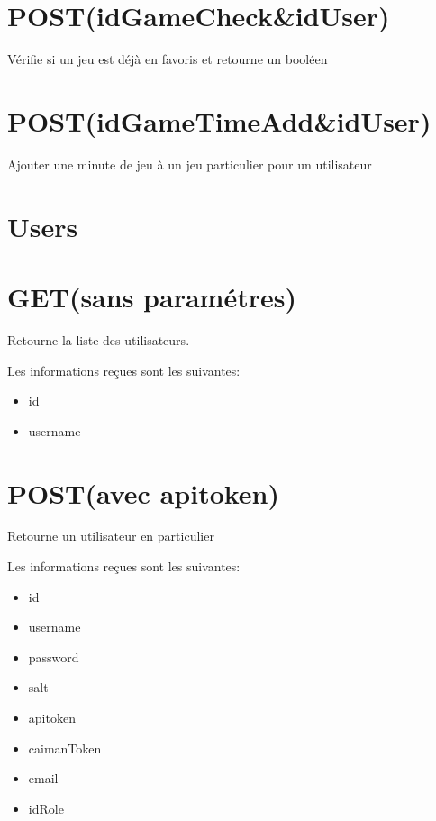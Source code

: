 \documentclass[a4paper,12pt,french]{sphinxmanual}
\begin{document}
\section{POST(idGameCheck\&idUser)}
\label{\detokenize{fonctionnelleAPI:post-idgamecheck-iduser}}
\sphinxAtStartPar
Vérifie si un jeu est déjà en favoris et retourne un booléen


\section{POST(idGameTimeAdd\&idUser)}
\label{\detokenize{fonctionnelleAPI:post-idgametimeadd-iduser}}
\sphinxAtStartPar
Ajouter une minute de jeu à un jeu particulier pour un utilisateur


\section{Users}
\label{\detokenize{fonctionnelleAPI:users}}

\section{GET(sans paramétres)}
\label{\detokenize{fonctionnelleAPI:get-sans-parametres}}
\sphinxAtStartPar
Retourne la liste des utilisateurs.

\sphinxAtStartPar
Les informations reçues sont les suivantes:
\begin{itemize}
\item {} 
\sphinxAtStartPar
id

\item {} 
\sphinxAtStartPar
username

\end{itemize}


\section{POST(avec apitoken)}
\label{\detokenize{fonctionnelleAPI:post-avec-apitoken}}
\sphinxAtStartPar
Retourne un utilisateur en particulier

\sphinxAtStartPar
Les informations reçues sont les suivantes:
\begin{itemize}
\item {} 
\sphinxAtStartPar
id

\item {} 
\sphinxAtStartPar
username

\item {} 
\sphinxAtStartPar
password

\item {} 
\sphinxAtStartPar
salt

\item {} 
\sphinxAtStartPar
apitoken

\item {} 
\sphinxAtStartPar
caimanToken

\item {} 
\sphinxAtStartPar
email

\item {} 
\sphinxAtStartPar
idRole

\end{itemize}
\end{document}
